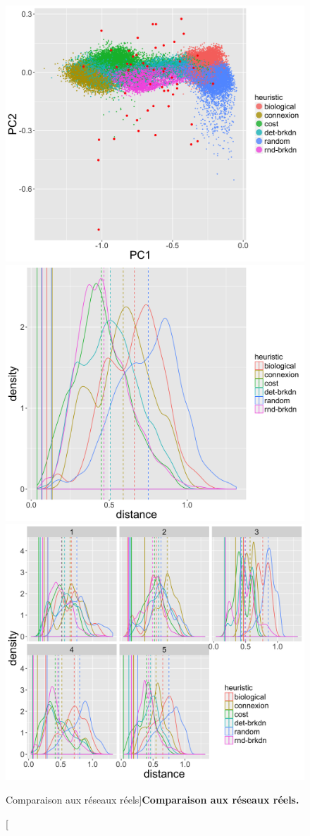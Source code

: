 \begin{figure}
\includegraphics[width=0.45\linewidth]{Figures/NetworkGrowth/feasible_space_withreal_pca}
\includegraphics[width=0.45\linewidth]{Figures/NetworkGrowth/distance_real}\\
\includegraphics[width=0.45\linewidth]{Figures/NetworkGrowth/distance_real_bymorph}
\caption[][Comparaison aux réseaux réels]{}{\textbf{Comparaison aux réseaux réels.} \label{fig:networkgrowth:realdistance}}
\end{figure}




%


